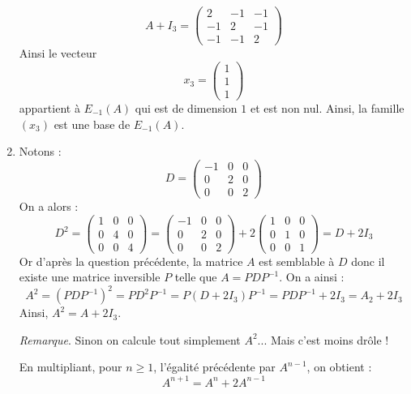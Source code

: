 \documentclass[a4paper,10pt]{report}
\begin{document}
\begin{enumerate}
$$ A+I_3  = \left(\begin{array}{ccc}
2 & -1 & -1\\
-1 & 2 & -1\\
-1 & -1 & 2
\end{array}\right)$$
Ainsi le vecteur 
$$ x_3 = \begin{pmatrix}
1 \\
1 \\
1
\end{pmatrix}$$
appartient à $E_{-1}(A)$ qui est de dimension $1$ et est non nul. Ainsi, la famille $(x_3)$ est une base de $E_{-1}(A)$.
\item Notons :
 \[D = \left( {\begin{array}{*{20}{c}}
{ - 1}&0&0\\
0&2&0\\
0&0&2
\end{array}} \right)\]
On a alors :
 \[{D^2} = \left( {\begin{array}{*{20}{c}}
1&0&0\\
0&4&0\\
0&0&4
\end{array}} \right) = \left( {\begin{array}{*{20}{c}}
{ - 1}&0&0\\
0&2&0\\
0&0&2
\end{array}} \right) + 2\left( {\begin{array}{*{20}{c}}
1&0&0\\
0&1&0\\
0&0&1
\end{array}} \right) = D +2 {I_3}\]
Or d'après la question précédente, la matrice $A$ est semblable à $D$ donc il existe une matrice inversible $P$ telle que $A=PDP^{-1}$. On a ainsi :
$$ A^2 = (PDP^{-1})^2 = PD^2P^{-1} = P(D+2I_3)P^{-1} = PDP^{-1} + 2I_3 = A_2+2 I_3$$
Ainsi, $A^2 = A + 2 I_3$. 

\medskip

\noindent \textit{Remarque}. Sinon on calcule tout simplement $A^2$... Mais c'est moins drôle !

\medskip

\noindent En multipliant, pour $n \geq 1$, l'égalité précédente par $A^{n-1}$, on obtient :
$$A^{n+1} = A^{n} + 2 A^{n-1}$$


\end{enumerate}
\end{document}
